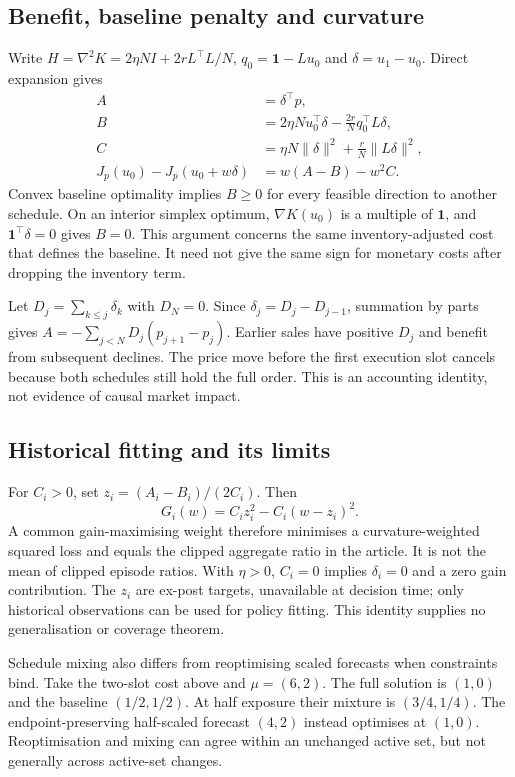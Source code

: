 \documentclass[11pt]{article}
\begin{document}
\subsection{Benefit, baseline penalty and curvature}
Write $H=\nabla^2K=2\eta NI+2rL^\top L/N$, $q_0=\mathbf1-Lu_0$ and $\delta=u_1-u_0$. Direct expansion gives
\begin{align*}
 A&=\delta^\top p,\\
 B&=2\eta N u_0^\top\delta-\frac{2r}{N}q_0^\top L\delta,\\
 C&=\eta N\|\delta\|^2+\frac rN\|L\delta\|^2,\\
 J_p(u_0)-J_p(u_0+w\delta)&=w(A-B)-w^2C.
\end{align*}
Convex baseline optimality implies $B\geq0$ for every feasible direction to another schedule. On an interior simplex optimum, $\nabla K(u_0)$ is a multiple of $\mathbf1$, and $\mathbf1^\top\delta=0$ gives $B=0$. This argument concerns the same inventory-adjusted cost that defines the baseline. It need not give the same sign for monetary costs after dropping the inventory term.

Let $D_j=\sum_{k\leq j}\delta_k$ with $D_N=0$. Since $\delta_j=D_j-D_{j-1}$, summation by parts gives $A=-\sum_{j<N}D_j(p_{j+1}-p_j)$. Earlier sales have positive $D_j$ and benefit from subsequent declines. The price move before the first execution slot cancels because both schedules still hold the full order. This is an accounting identity, not evidence of causal market impact.

\subsection{Historical fitting and its limits}
For $C_i>0$, set $z_i=(A_i-B_i)/(2C_i)$. Then
\[
 G_i(w)=C_i z_i^2-C_i(w-z_i)^2.
\]
A common gain-maximising weight therefore minimises a curvature-weighted squared loss and equals the clipped aggregate ratio in the article. It is not the mean of clipped episode ratios. With $\eta>0$, $C_i=0$ implies $\delta_i=0$ and a zero gain contribution. The $z_i$ are ex-post targets, unavailable at decision time; only historical observations can be used for policy fitting. This identity supplies no generalisation or coverage theorem.

Schedule mixing also differs from reoptimising scaled forecasts when constraints bind. Take the two-slot cost above and $\mu=(6,2)$. The full solution is $(1,0)$ and the baseline $(1/2,1/2)$. At half exposure their mixture is $(3/4,1/4)$. The endpoint-preserving half-scaled forecast $(4,2)$ instead optimises at $(1,0)$. Reoptimisation and mixing can agree within an unchanged active set, but not generally across active-set changes.
\end{document}
